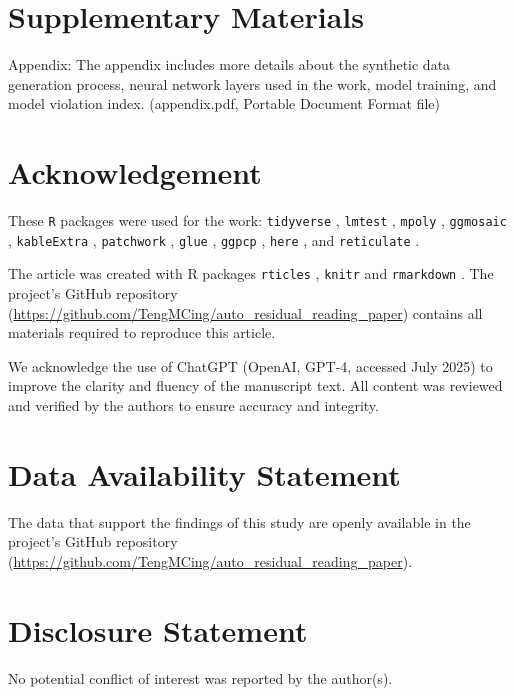 \documentclass[]{interact}
\theoremstyle{plain}%
\theoremstyle{definition}
\theoremstyle{remark}
\begin{document}
\section*{Supplementary Materials}\label{supplementary-materials}

\begin{description}
\item{Appendix:} The appendix includes more details about the synthetic data generation process, neural network layers used in the work, model training, and model violation index. (appendix.pdf, Portable Document Format file)
\end{description}

\section*{Acknowledgement}\label{acknowledgement}

These \texttt{R} packages were used for the work: \texttt{tidyverse}
\citep{tidyverse}, \texttt{lmtest} \citep{lmtest}, \texttt{mpoly}
\citep{mpoly}, \texttt{ggmosaic} \citep{ggmosaic}, \texttt{kableExtra}
\citep{kableextra}, \texttt{patchwork} \citep{patchwork}, \texttt{glue}
\citep{glue}, \texttt{ggpcp} \citep{ggpcp}, \texttt{here} \citep{here},
and \texttt{reticulate} \citep{reticulate}.

The article was created with R packages \texttt{rticles}
\citep{rticles}, \texttt{knitr} \citep{knitr} and \texttt{rmarkdown}
\citep{rmarkdown}. The project's GitHub repository
(\url{https://github.com/TengMCing/auto_residual_reading_paper})
contains all materials required to reproduce this article.

We acknowledge the use of ChatGPT (OpenAI, GPT-4, accessed July 2025) to
improve the clarity and fluency of the manuscript text. All content was
reviewed and verified by the authors to ensure accuracy and integrity.

\section*{Data Availability
Statement}\label{data-availability-statement}

The data that support the findings of this study are openly available in
the project's GitHub repository
(\url{https://github.com/TengMCing/auto_residual_reading_paper}).

\section*{Disclosure Statement}\label{disclosure-statement}

No potential conflict of interest was reported by the author(s).



\end{document}
